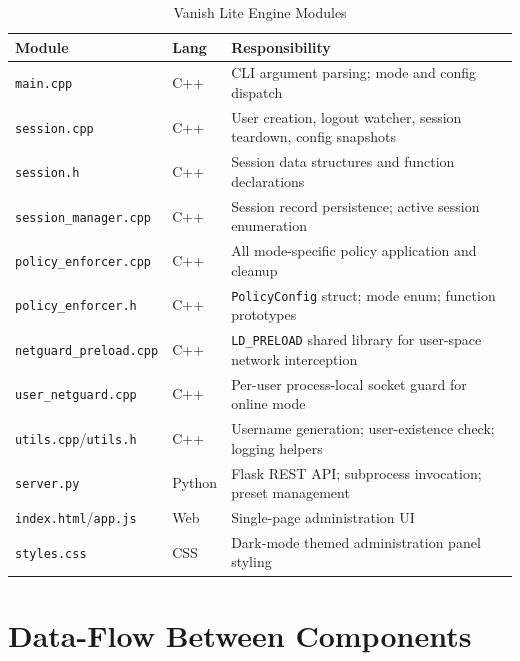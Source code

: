 \begin{table}[H]
\centering
\caption{Vanish Lite Engine Modules}
\label{tab:modules}
\begin{tabularx}{\linewidth}{p{4.5cm} l X}
\toprule
Module & Lang & Responsibility \\
\midrule
\texttt{main.cpp} & C++ & CLI argument parsing; mode and config dispatch \\
\texttt{session.cpp} & C++ & User creation, logout watcher, session teardown, config snapshots \\
\texttt{session.h} & C++ & Session data structures and function declarations \\
\texttt{session\_manager.cpp} & C++ & Session record persistence; active session enumeration \\
\texttt{policy\_enforcer.cpp} & C++ & All mode-specific policy application and cleanup \\
\texttt{policy\_enforcer.h} & C++ & \texttt{PolicyConfig} struct; mode enum; function prototypes \\
\texttt{netguard\_preload.cpp} & C++ & \texttt{LD\_PRELOAD} shared library for user-space network interception \\
\texttt{user\_netguard.cpp} & C++ & Per-user process-local socket guard for online mode \\
\texttt{utils.cpp}/\texttt{utils.h} & C++ & Username generation; user-existence check; logging helpers \\
\texttt{server.py} & Python & Flask REST API; subprocess invocation; preset management \\
\texttt{index.html}/\texttt{app.js} & Web & Single-page administration UI \\
\texttt{styles.css} & CSS & Dark-mode themed administration panel styling \\
\bottomrule
\end{tabularx}
\end{table}

\section{Data-Flow Between Components}

